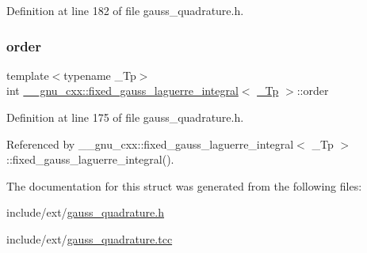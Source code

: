 Definition at line 182 of file gauss\+\_\+quadrature.\+h.

\mbox{\label{struct____gnu__cxx_1_1fixed__gauss__laguerre__integral_a30797226c31b897d15facc65d55c673b}} 
\subsubsection{\texorpdfstring{order}{order}}
{\footnotesize\ttfamily template$<$typename \+\_\+\+Tp$>$ \\
int \hyperlink{struct____gnu__cxx_1_1fixed__gauss__laguerre__integral}{\+\_\+\+\_\+gnu\+\_\+cxx\+::fixed\+\_\+gauss\+\_\+laguerre\+\_\+integral}$<$ \hyperlink{namespace____gnu__cxx_a3b19a9c800ca194374ef9172290f7d79}{\+\_\+\+Tp} $>$\+::order}



Definition at line 175 of file gauss\+\_\+quadrature.\+h.



Referenced by \+\_\+\+\_\+gnu\+\_\+cxx\+::fixed\+\_\+gauss\+\_\+laguerre\+\_\+integral$<$ \+\_\+\+Tp $>$\+::fixed\+\_\+gauss\+\_\+laguerre\+\_\+integral().



The documentation for this struct was generated from the following files\+:\begin{DoxyCompactItemize}
\item 
include/ext/\hyperlink{gauss__quadrature_8h}{gauss\+\_\+quadrature.\+h}\item 
include/ext/\hyperlink{gauss__quadrature_8tcc}{gauss\+\_\+quadrature.\+tcc}\end{DoxyCompactItemize}
